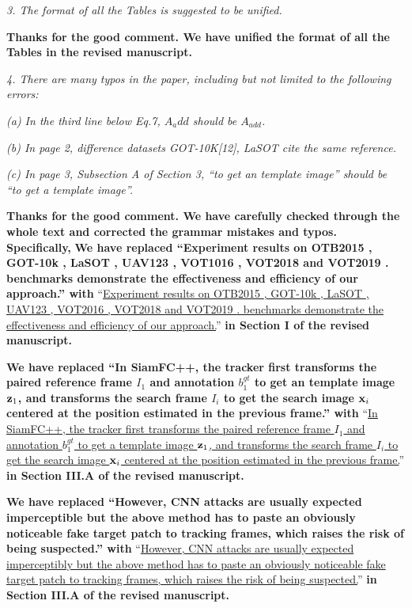 \documentclass[12pt]{article}
\begin{document}
\textit{3. The format of all the Tables is suggested to be unified.}

\textbf{Thanks for the good comment. We have unified the format of all the Tables in the revised manuscript.}

\textit{4. There are many typos in the paper, including but not limited to the following errors:}

\textit{(a) In the third line below Eq.7, $A_{a}dd$ should be $A_{add}$.}

\textit{(b) In page 2, difference datasets GOT-10K[12], LaSOT \cite{LaSOT} cite the same reference.}

\textit{(c) In page 3, Subsection A of Section 3, “to get an template image” should be “to get a template image”.}

\textbf{Thanks for the good comment. We have carefully checked through the whole text and corrected the grammar mistakes and typos. Specifically,}
\textbf{We have replaced ``Experiment results on OTB2015 \cite{OTB}, GOT-10k \cite{GOT-10k}, LaSOT \cite{GOT-10k}, UAV123 \cite{UAV123}, VOT1016 \cite{VOT2016}, VOT2018 \cite{VOT2018} and VOT2019 \cite{VOT2019}. benchmarks demonstrate the effectiveness and efficiency of our approach.'' with}
``\uline{Experiment results on OTB2015 \cite{OTB}, GOT-10k \cite{GOT-10k}, LaSOT \cite{LaSOT}, UAV123 \cite{UAV123}, VOT2016 \cite{VOT2016}, VOT2018 \cite{VOT2018} and VOT2019 \cite{VOT2019}. benchmarks demonstrate the effectiveness and efficiency of our approach.}''
\textbf{in Section I of the revised manuscript.}

\textbf{We have replaced ``In SiamFC++, the tracker first transforms the paired reference frame $I_1$ and annotation $b_1^{gt}$ to get an template image $\textbf z_1$, and transforms the search frame $I_i$ to get the search image $\textbf x_i$ centered at the position estimated in the previous frame.'' with}
``\uline{In SiamFC++, the tracker first transforms the paired reference frame $I_1$ and annotation $b_1^{gt}$ to get a template image $\textbf z_1$, and transforms the search frame $I_i$ to get the search image $\textbf x_i$ centered at the position estimated in the previous frame.}''
\textbf{in Section III.A of the revised manuscript.}

\textbf{We have replaced ``However, CNN attacks are usually expected imperceptible but the above method has to paste an obviously noticeable fake target patch to tracking frames, which raises the risk of being suspected.'' with}
``\uline{However, CNN attacks are usually expected imperceptibly but the above method has to paste an obviously noticeable fake target patch to tracking frames, which raises the risk of being suspected.}''
\textbf{in Section III.A of the revised manuscript.}
\end{document}
